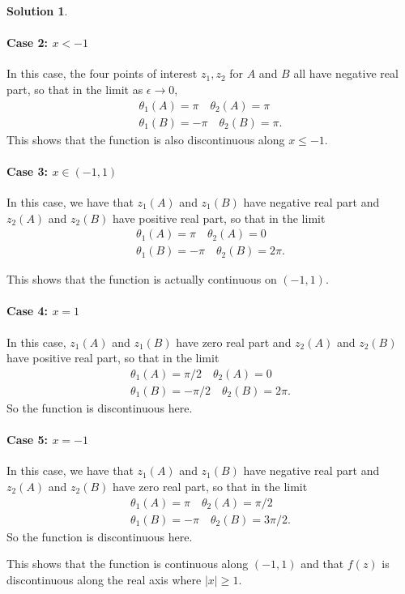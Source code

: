 \documentclass[12pt]{article}
\newcommand{\abs}[1]{ \left| #1 \right| }
\theoremstyle{definition}
\newtheorem{sol}{Solution}
\theoremstyle{remark}
\begin{document}
\begin{sol}
    \paragraph{Case 2: $x< -1$}%
  In this case, the four points of interest $z_1, z_2$ for $A$ and $B$ all have negative real part, so that in the limit as $\epsilon \to 0$,
   \begin{align*}
   \theta_1(A) = \pi \quad \theta_2(A) = \pi\\
   \theta_1(B) = -\pi \quad \theta_2(B) = \pi.
   \end{align*}
   This shows that the function is also discontinuous along $x\leq -1$.

   \paragraph{Case 3: $x\in (-1,1)$}
   In this case, we have that $z_1(A)$ and $z_1(B)$ have negative real part and $z_2(A)$ and $z_2(B)$ have positive real part, so that in the limit
   \begin{align*}
   \theta_1(A) = \pi \quad \theta_2(A) = 0\\
   \theta_1(B) = -\pi \quad \theta_2(B) = 2\pi.
   \end{align*} 

   This shows that the function is actually continuous on $(-1,1)$.

   \paragraph{Case 4: $x=1$}%
   
   In this case, $z_1(A)$ and $z_1(B)$ have zero real part and $z_2(A)$ and $z_2(B)$ have positive real part, so that in the limit
   \begin{align*}
   \theta_1(A) = \pi / 2 \quad \theta_2(A) = 0\\
   \theta_1(B) = -\pi  / 2\quad \theta_2(B) = 2\pi.
   \end{align*} 
   So the function is discontinuous here.

   \paragraph{Case 5: $x=-1$}%
    In this case, we have that $z_1(A)$ and $z_1(B)$ have negative real part and $z_2(A)$ and $z_2(B)$ have zero real part, so that in the limit
   \begin{align*}
   \theta_1(A) = \pi \quad \theta_2(A) = \pi / 2\\
   \theta_1(B) = -\pi \quad \theta_2(B) = 3\pi / 2.
   \end{align*} 
   So the function is discontinuous here.

   
   This shows that the function is continuous along $(-1,1)$ and that $f(z)$ is discontinuous along the real axis where $\abs{x}\geq1$.
   
\end{sol}
\end{document}

